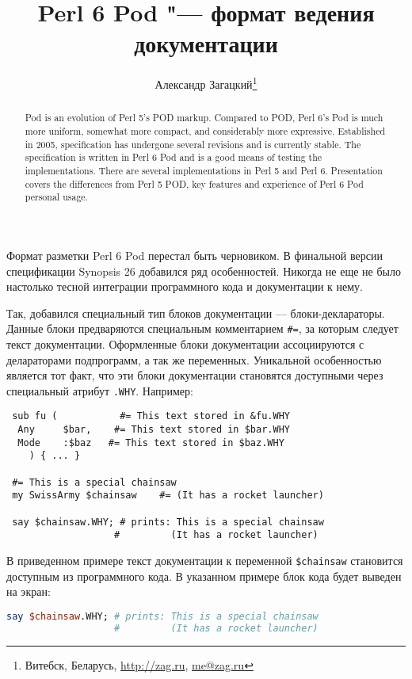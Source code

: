 \documentclass[10pt, a5paper]{article}
\begin{document}
\title{Perl 6 Pod "--- формат ведения документации}
\author{Александр Загацкий\footnote{Витебск, Беларусь, \url{http://zag.ru}, \url{me@zag.ru}}}
\date{}
\maketitle

\begin{abstract}
Pod is an evolution of Perl 5's POD markup. Compared to POD, Perl 6's
Pod is much more
uniform, somewhat more compact, and considerably more
expressive. Established in 2005, specification
has undergone several revisions and is currently stable. The
specification is written in Perl 6 Pod and is a
good means of testing the implementations.
There are several imple\-men\-ta\-tions in Perl 5 and Perl 6.
Presentation covers the differences from Perl 5 POD, key features and 
experience of Perl 6 Pod personal usage.
\end{abstract}

Формат разметки Perl 6 Pod перестал быть черновиком. В финальной версии
спецификации Synopsis 26 \cite{zag1pod} добавился ряд особенностей.
Никогда не еще не было настолько тесной интеграции программного кода и
документации к нему.

Так, добавился специальный тип блоков документации --- блоки-деклараторы.
Данные блоки предваряются специальным комментарием \verb!#=!, за которым
следует текст документации. Оформленные блоки документации ассоциируются
с делараторами подпрограмм, а так же переменных. Уникальной особенностью
является тот факт, что эти блоки документации становятся доступными
через специальный атрибут \verb!.WHY!. Например:

\begin{verbatim}
 sub fu (           #= This text stored in &fu.WHY
  Any     $bar,    #= This text stored in $bar.WHY
  Mode    :$baz   #= This text stored in $baz.WHY
    ) { ... }

 #= This is a special chainsaw
 my SwissArmy $chainsaw    #= (It has a rocket launcher)

 say $chainsaw.WHY; # prints: This is a special chainsaw
                   #         (It has a rocket launcher)
\end{verbatim}


В приведенном примере текст документации к переменной \linebreak \verb!$chainsaw!
становится доступным из программного кода. В указанном примере блок кода
будет выведен на экран:
\begin{lstlisting}[language={Perl}]
 say $chainsaw.WHY; # prints: This is a special chainsaw
                   #         (It has a rocket launcher)
\end{lstlisting}
\end{document}
